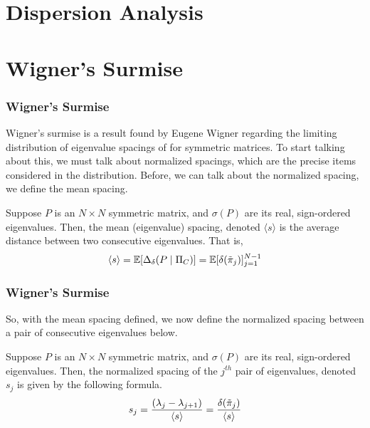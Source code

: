 \section{Dispersion Analysis}





\section{Wigner's Surmise}

\begin{frame} \frametitle{Wigner's Surmise}

Wigner's surmise is a result found by Eugene Wigner regarding the limiting distribution of eigenvalue spacings of for symmetric matrices.
To start talking about this, we must talk about normalized spacings, which are the precise items considered in the distribution.
Before, we can talk about the normalized spacing, we define the mean spacing.

\begin{alertblock}{}
Suppose $P$ is an $N \times N$ symmetric matrix, and $\sigma(P)$ are its real, sign-ordered eigenvalues.
Then, the mean (eigenvalue) spacing, denoted $\langle s \rangle$ is the average distance between two consecutive eigenvalues. That is,
$$\langle s \rangle = \mathbb{E}[\Delta_\delta(P \mid \Pi_C)] = \mathbb{E}[\delta({\tilde{\pi}}_{j})]_{j = 1}^{N - 1}$$
\end{alertblock}

\end{frame}


\begin{frame} \frametitle{Wigner's Surmise}

\noindent So, with the mean spacing defined, we now define the normalized spacing between a pair of consecutive eigenvalues below.

\begin{alertblock}{}
Suppose $P$ is an $N \times N$ symmetric matrix, and $\sigma(P)$ are its real, sign-ordered eigenvalues.
Then, the normalized spacing of the $j^{th}$ pair of eigenvalues, denoted $s_j$ is given by the following formula.
$$s_j = \frac{(\lambda_j - \lambda_{j+1})}{{\langle s \rangle}} = \frac{\delta({\tilde{\pi}}_{j})}{\langle s \rangle}$$
\end{alertblock}

\end{frame}

